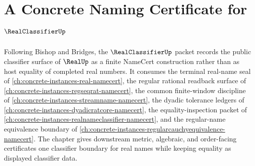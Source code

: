 \chapter{A Concrete Naming Certificate for $\RealClassifierUp$}
\label{ch:concrete-instances-real-classifier-namecert}

Following Bishop and Bridges, the $\RealClassifierUp$ packet records the public classifier surface of $\RealUp$ as a finite NameCert construction rather than as host equality of completed real numbers. It consumes the terminal real-name seal of \autoref{ch:concrete-instances-real-namecert}, the regular rational readback surface of \autoref{ch:concrete-instances-regseqrat-namecert}, the common finite-window discipline of \autoref{ch:concrete-instances-streamname-namecert}, the dyadic tolerance ledgers of \autoref{ch:concrete-instances-dyadicratcore-namecert}, the equality-inspection packet of \autoref{ch:concrete-instances-realnameclassifier-namecert}, and the regular-name equivalence boundary of \autoref{ch:concrete-instances-regularcauchyequivalence-namecert}. The chapter gives downstream metric, algebraic, and order-facing certificates one classifier boundary for real names while keeping equality as displayed classifier data.


